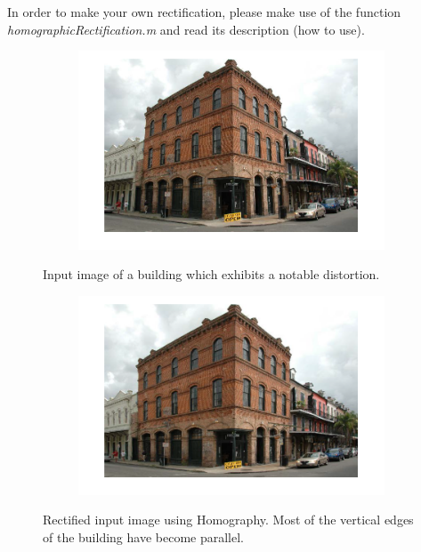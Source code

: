 \documentclass{paper}
\begin{document}
In order to make your own rectification, please make use of the function \emph{homographicRectification.m} and read its description (how to use).


\begin{figure}[H]
    \centering
    \begin{subfigure}{1.0\textwidth}
        \includegraphics[width=\textwidth]{rectify/input_building}
    \end{subfigure}
    
    \caption{Input image of a building which exhibits a notable distortion.}
    \label{fig:rectify_input_building}       
\end{figure}

\begin{figure}[H]
    \centering
    \begin{subfigure}{1.0\textwidth}
        \includegraphics[width=\textwidth]{rectify/rectified_building}
    \end{subfigure}
    
    \caption{Rectified input image using Homography. Most of the vertical edges of the building have become parallel. }
    \label{fig:rectified_building}       
\end{figure}
\end{document}
